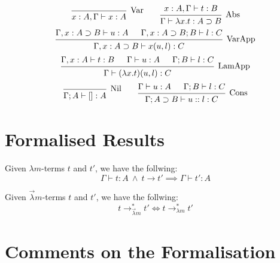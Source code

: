 \begin{definition}
  \[
    \begin{prooftree}
      \infer0[Var]{ x:A, \Gamma \vdash x:A } 
    \end{prooftree}
    \qquad
    \begin{prooftree}
      \hypo{ x:A, \Gamma \vdash t:B }
      \infer1[Abs]{ \Gamma \vdash \lambda x . t : A \supset B  } 
    \end{prooftree}
  \]
  \[
    \begin{prooftree}
      \hypo{ \Gamma, x:A \supset B \vdash u:A}
      \hypo{ \Gamma, x:A \supset B ; B \vdash l:C }	
      \infer2[VarApp]{ \Gamma, x:A \supset B \vdash x(u, l) : C } 
    \end{prooftree}
  \]
  \[
    \begin{prooftree}
      \hypo{ \Gamma, x:A \vdash t:B }
      \hypo{ \Gamma \vdash u:A }
      \hypo{ \Gamma ; B \vdash l : C }	
      \infer3[LamApp]{ \Gamma \vdash (\lambda x . t)(u, l) : C } 
    \end{prooftree}
  \]
  \[
    \begin{prooftree}
      \infer0[Nil]{ \Gamma ; A \vdash []:A } 
    \end{prooftree}
    \qquad
    \begin{prooftree}
      \hypo{ \Gamma \vdash u:A }
      \hypo{ \Gamma ; B \vdash l:C }
      \infer2[Cons]{ \Gamma ; A \supset B \vdash  u::l : C } 
    \end{prooftree}
  \]
\end{definition}

\section{Formalised Results}

\begin{theorem}
  Given $\lambda m$-terms $t$ and $t'$, we have the follwing:
  \[
    \Gamma \vdash t : A \ \land \ t \to t' \implies \Gamma \vdash t' : A
  \]
\end{theorem}

\begin{theorem}[Conservativeness]
  Given $\vec \lambda m$-terms $t$ and $t'$, we have the follwing:
  \[
    t \to^{*}_{\vec \lambda m} t' \Longleftrightarrow
    t \to^{*}_{\lambda m} t'
  \]
\end{theorem}

\section{Comments on the Formalisation}

